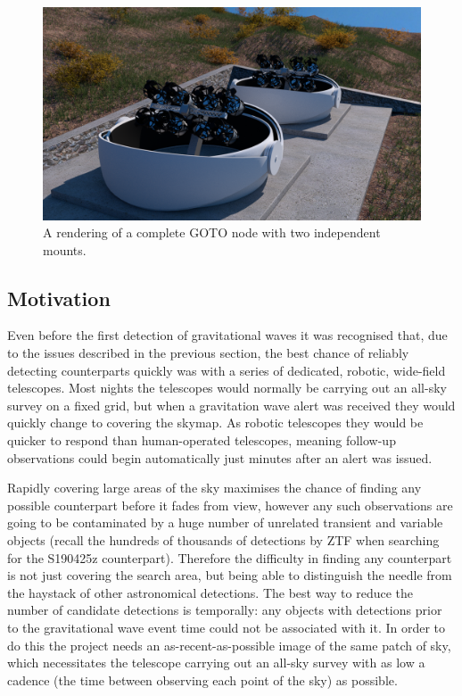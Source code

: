 \begin{colsection}
\begin{colsection}
\begin{figure}[p]
    \begin{center}
        \includegraphics[width=0.9\linewidth]{images/goto_render.png}
    \end{center}
    \caption[A rendering of a complete GOTO node]{
        A rendering of a complete GOTO node with two independent mounts.
    }\label{fig:goto_render}
\end{figure}

\end{colsection}


\subsection{Motivation}
\label{sec:goto_motivation}
\begin{colsection}

Even before the first detection of gravitational waves it was recognised that, due to the issues described in the previous section, the best chance of reliably detecting counterparts quickly was with a series of dedicated, robotic, wide-field telescopes. Most nights the telescopes would normally be carrying out an all-sky survey on a fixed grid, but when a gravitation wave alert was received they would quickly change to covering the skymap. As robotic telescopes they would be quicker to respond than human-operated telescopes, meaning follow-up observations could begin automatically just minutes after an alert was issued.

Rapidly covering large areas of the sky maximises the chance of finding any possible counterpart before it fades from view, however any such observations are going to be contaminated by a huge number of unrelated transient and variable objects (recall the hundreds of thousands of detections by ZTF when searching for the S190425z counterpart). Therefore the difficulty in finding any counterpart is not just covering the search area, but being able to distinguish the needle from the haystack of other astronomical detections. The best way to reduce the number of candidate detections is temporally: any objects with detections prior to the gravitational wave event time could not be associated with it. In order to do this the project needs an as-recent-as-possible image of the same patch of sky, which necessitates the telescope carrying out an all-sky survey with as low a cadence (the time between observing each point of the sky) as possible.


\end{colsection}
\end{colsection}
